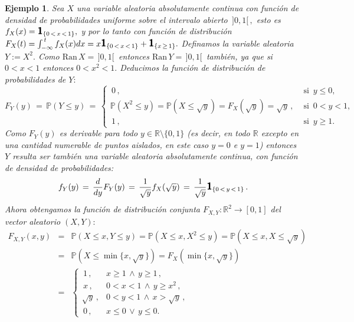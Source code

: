 \documentclass[spanish,10pt,letterpaper]{article}
\newtheorem{ejem}{Ejemplo}
\newcommand{\prob}{\mathbb{P}}
\newcommand{\Runo}{\mathbb{R}}
\newcommand{\indic}{\textbf{\textsf{\large{1}}}}
\begin{document}
\begin{ejem}\label{ej:vectorcontNoabscont}
    Sea $X$ una variable aleatoria absolutamente continua con función de densidad de probabilidades uniforme sobre el intervalo abierto $\,]0,1[\,,$ esto es $f_X(x)=\indic_{\{0\,<\,x\,<\,1\}},$ y por lo tanto con función de distribución \linebreak  $F_X(t)=\int_{-\infty}^{\,t}f_X(x)dx = x\indic_{\{0\,<\,x\,<\,1\}}+\indic_{\{x\,\geq\,1\}}.$ Definamos la variable aleatoria $Y:=X^2.$ Como $\text{Ran}\,X=\,]0,1[\,$ entonces $\text{Ran}\,Y=\,]0,1[\,$ también, ya que si $0<x<1$ entonces $0<x^2<1.$ Deducimos la función de distribución de probabilidades de $Y:$
    $$F_Y(y) \,=\, \prob(Y\leq y) \,=\, \begin{cases}
        \,0\,, & \text{ si } \,y\leq 0, \\
        \prob(X^2\leq y) = \prob(X\leq\sqrt{y}) = F_X(\sqrt{y}) = \sqrt{y}\,, & \text{ si } \,0<y<1, \\
        \,1\,, & \text{ si } \,y\geq 1. 
    \end{cases}$$
    Como $F_Y(y)$ es derivable para todo $y\in\Runo\setminus\{0,1\}$ (es decir, en todo $\Runo$ excepto en una cantidad numerable de puntos aislados, en este caso $y=0$ e $y=1$) entonces $Y$ resulta ser también una variable aleatoria absolutamente continua, con función de densidad de probabilidades:
    $$f_Y(y) \,=\, \frac{d}{dy}F_Y(y) \,=\, \frac{1}{\sqrt{y}}f_X(\sqrt{y}) \,=\, \frac{1}{\sqrt{y}}\indic_{\{0\,<\,y\,<\,1\}}\,.$$
    Ahora obtengamos la función de distribución conjunta $F_{X,Y}:\Runo^2\rightarrow[0,1]$ del vector aleatorio $(X,Y):$
    \begin{eqnarray*}
        F_{X,Y}(x,y) &=& \prob(X\leq x,Y\leq y) = \prob(X\leq x, X^2\leq y) = \prob(X\leq x, X\leq\sqrt{y}) \\
                     &=& \prob(X\leq\min\{x,\sqrt{y}\}) = F_X(\min\{x,\sqrt{y}\}) \\ 
                     &=& \begin{cases}
                            \,1\,, & x\geq 1\,\wedge\,y\geq 1\,,\\
                            \,x\,, & 0<x<1\,\wedge\,y\geq x^2\,,\\
                            \sqrt{y}\,, & 0<y<1\,\wedge\,x>\sqrt{y}\,,\\
                            \,0\,, & x\leq 0 \,\vee\,y\leq 0.
                         \end{cases}
    \end{eqnarray*}

\end{ejem}
\end{document}
